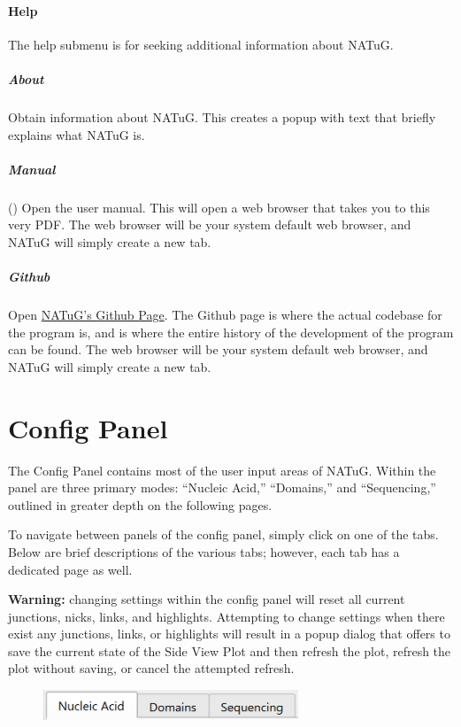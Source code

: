 \documentclass[
titlepage,
fontsize=12pt
]{article}
\newcommand{\sunken}[1]{\tcbox[on line, boxsep=.01in, left=0in, right=0in, top=0in, bottom=0in, colframe=sunken-color-outline, colback=sunken-color-background, arc=0.015in]{\texttt{#1}}}
\begin{document}
	\paragraph{Help}
	The help submenu is for seeking additional information about NATuG.
	
	\subparagraph{About} 
	Obtain information about NATuG. This creates a popup with text that briefly explains what NATuG is.
	
	\subparagraph{Manual} (\sunken{control+h}) 
	Open the user manual. This will open a web browser that takes you to this very PDF. The web browser will be your system default web browser, and NATuG will simply create a new tab.
	
	\subparagraph{Github} 
	Open \href{https://github.com/404Wolf/NATuG}{NATuG's Github Page}. The Github page is where the actual codebase for the program is, and is where the entire history of the development of the program can be found. The web browser will be your system default web browser, and NATuG will simply create a new tab.
	
	\section{Config Panel} \label{section:config-panel}
	The Config Panel contains most of the user input areas of NATuG. Within the panel are three primary modes: “Nucleic Acid,” “Domains,” and “Sequencing,” outlined in greater depth on the following pages. 
	
	To navigate between panels of the config panel, simply click on one of the tabs. Below are brief descriptions of the various tabs; however, each tab has a dedicated page as well.
	
	\textbf{Warning:} changing settings within the config panel will reset all current junctions, nicks, links, and highlights. Attempting to change settings when there exist any junctions, links, or highlights will result in a popup dialog that offers to save the current state of the Side View Plot and then refresh the plot, refresh the plot without saving, or cancel the attempted refresh.
	
	\begin{figure}[h]
		\centering
		\includegraphics[width=3in]{"nucleic-acid-tab-activated.png"}
		\label{fig:nucleic-acid-tab-activated}
	\end{figure}
	
\end{document}
